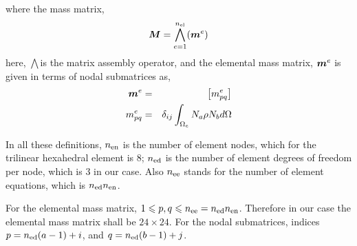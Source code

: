 
where the mass matrix,
\[ \boldsymbol{M}= \bigwedge_{e = 1}^{n_{\operatorname{el}}} (\boldsymbol{m}^e ) \]
here, $\bigwedge$is the matrix assembly operator, and the elemental mass
matrix, $\boldsymbol{m}^e$ is given in terms of nodal submatrices as,
\begin{eqnarray}
  \boldsymbol{m}^e & = & \left[ m_{p q}^e \right] \nonumber\\
  m_{p q}^e & = & \delta_{i j} \int_{\Omega_e} N_a \rho N_b d \Omega 
\end{eqnarray}
\begin{notation}
  In all these definitions, $n_{\operatorname{en}}$ is the number of element nodes,
  which for the trilinear hexahedral element is 8; $n_{\operatorname{ed}}$ is the
  number of element degrees of freedom per node, which is 3 in our case. Also
  $n_{\operatorname{ee}}$ stands for the number of element equations, which is
  $n_{\operatorname{ed}} n_{\operatorname{en}}$.
\end{notation}

\begin{notation}
  For the elemental mass matrix, $1 \leqslant p, q \leqslant n_{\operatorname{ee}} =
  n_{\operatorname{ed}} n_{\operatorname{en}}$. Therefore in our case the elemental mass
  matrix shall be $24 \times 24$. For the nodal submatrices, indices  $p =
  n_{\operatorname{ed}} ( a - 1 ) + i$, and $q = n_{\operatorname{ed}} ( b - 1 ) + j$. 
\end{notation}

